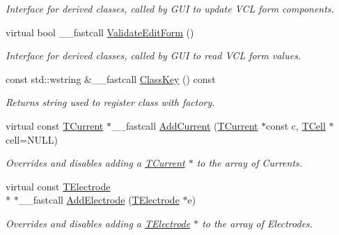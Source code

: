 \begin{DoxyCompactItemize}
\begin{DoxyCompactList}\small\item\em Interface for derived classes, called by G\+U\+I to update V\+C\+L form components. \end{DoxyCompactList}\item 
\hypertarget{class_t_playback_electrode_a0d5e4e5828b7c9e877eaae2228ac219f}{virtual bool \+\_\+\+\_\+fastcall \hyperlink{class_t_playback_electrode_a0d5e4e5828b7c9e877eaae2228ac219f}{Validate\+Edit\+Form} ()}\label{class_t_playback_electrode_a0d5e4e5828b7c9e877eaae2228ac219f}

\begin{DoxyCompactList}\small\item\em Interface for derived classes, called by G\+U\+I to read V\+C\+L form values. \end{DoxyCompactList}\item 
const std\+::wstring \&\+\_\+\+\_\+fastcall \hyperlink{class_t_playback_electrode_ab1174a8ccda8d316130a899471341374}{Class\+Key} () const 
\begin{DoxyCompactList}\small\item\em Returns string used to register class with factory. \end{DoxyCompactList}\item 
\hypertarget{class_t_playback_electrode_a4d166b8df4a0f7798113c03bd804c2d7}{virtual const \hyperlink{class_t_current}{T\+Current} $\ast$\+\_\+\+\_\+fastcall \hyperlink{class_t_playback_electrode_a4d166b8df4a0f7798113c03bd804c2d7}{Add\+Current} (\hyperlink{class_t_current}{T\+Current} $\ast$const c, \hyperlink{class_t_cell}{T\+Cell} $\ast$cell=N\+U\+L\+L)}\label{class_t_playback_electrode_a4d166b8df4a0f7798113c03bd804c2d7}

\begin{DoxyCompactList}\small\item\em Overrides and disables adding a \hyperlink{class_t_current}{T\+Current} $\ast$ to the array of Currents. \end{DoxyCompactList}\item 
\hypertarget{class_t_playback_electrode_a051024e0d384e288ee2f6420aba34568}{virtual const \hyperlink{class_t_electrode}{T\+Electrode} \\*
$\ast$\+\_\+\+\_\+fastcall \hyperlink{class_t_playback_electrode_a051024e0d384e288ee2f6420aba34568}{Add\+Electrode} (\hyperlink{class_t_electrode}{T\+Electrode} $\ast$e)}\label{class_t_playback_electrode_a051024e0d384e288ee2f6420aba34568}

\begin{DoxyCompactList}\small\item\em Overrides and disables adding a \hyperlink{class_t_electrode}{T\+Electrode} $\ast$ to the array of Electrodes. \end{DoxyCompactList}\end{DoxyCompactItemize}
